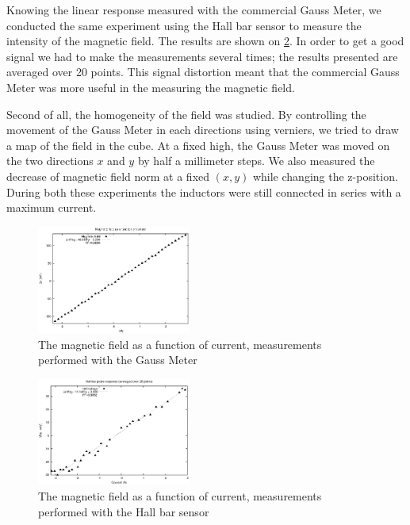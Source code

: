 \documentclass[journal]{IEEEtran}
\begin{document}
Knowing the linear response measured with the commercial Gauss Meter, we conducted the same experiment using the Hall bar sensor to measure the intensity of the magnetic field. The results are shown on \figurename \ref{fig:linear_hall_20}. In order to get a good signal we had to make the measurements several times; the results presented are averaged over 20 points. This signal distortion meant that the commercial Gauss Meter was more useful in the measuring the magnetic field.

Second of all, the homogeneity of the field was studied. By controlling the movement of the Gauss Meter in each directions using verniers, we tried to draw a map of the field in the cube. At a fixed high, the Gauss Meter was moved on the two directions $x$ and $y$ by half a millimeter steps. We also measured the decrease of magnetic field norm at a fixed $(x,y)$ while changing the z-position. During both these experiments the inductors were still connected in series with a maximum current.





\begin{figure}[h]
\centering
\includegraphics[width=0.45\textwidth]{champ_fonction_courant.eps}
\caption{The magnetic field as a function of current, measurements performed with the Gauss Meter}
\label{fig:linear_gauss}
\end{figure}



\begin{figure}[h]
\centering
\includegraphics[width=0.45\textwidth]{rampe_courant_20.eps}
\caption{The magnetic field as a function of current, measurements performed with the Hall bar sensor}
\label{fig:linear_hall_20}
\end{figure}
\end{document}
